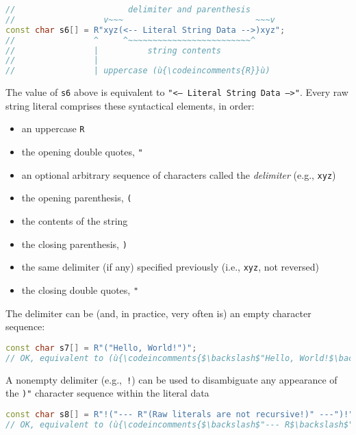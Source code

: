\begin{lstlisting}[language=C++]
//                       delimiter and parenthesis
//                  v~~~                           ~~~v
const char s6[] = R"xyz(<-- Literal String Data -->)xyz";
//                ^     ^~~~~~~~~~~~~~~~~~~~~~~~~~^
//                |          string contents
//                |
//                | uppercase (ù{\codeincomments{R}}ù)
\end{lstlisting}

\noindent The value of \texttt{s6} above is equivalent to
\texttt{"<--}~\texttt{Literal}~\texttt{String}~\texttt{Data}~\texttt{-->"}.
Every raw string literal comprises these syntactical elements, in order:
\begin{itemize}
\item{an uppercase \texttt{R}}
\item{the opening double quotes, \texttt{"}}
\item{an optional arbitrary sequence of characters called the \emph{delimiter} (e.g., \texttt{xyz})}
\item{the opening parenthesis, \texttt{(}}
\item{the contents of the string}
\item{the closing parenthesis, \texttt{)}}
\item{the same delimiter (if any) specified previously (i.e., \texttt{xyz}, not reversed)}
\item{the closing double quotes, \texttt{"}}
\end{itemize}

The delimiter can be (and, in practice, very often is) an empty character
sequence:

\begin{lstlisting}[language=C++]
const char s7[] = R"("Hello, World!")";
// OK, equivalent to (ù{\codeincomments{$\backslash$"Hello, World!$\backslash$"}}ù)
\end{lstlisting}

\noindent A nonempty delimiter (e.g.,~\texttt{!}) can be used to disambiguate any
appearance of the \texttt{)"} character sequence within the literal data

\begin{lstlisting}[language=C++]
const char s8[] = R"!("--- R"(Raw literals are not recursive!)" ---")!";
// OK, equivalent to (ù{\codeincomments{$\backslash$"--- R$\backslash$"(Raw literals are not recursive!)$\backslash$" ---$\backslash$"}}ù)
\end{lstlisting}

